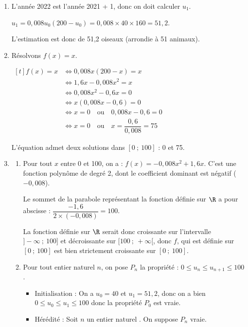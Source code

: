 \medskip

\begin{enumerate}
\item L'année 2022 est l'année 2021 + 1, donc on doit calculer $u_1$.

$u_1 = 0,008u_0(200 - u_0) = 0,008\times 40 \times 160 = 51,2$.

L'estimation est donc de 51,2 oiseaux (arrondie à 51 animaux).

\item Résolvons $f(x) = x$.

$ \begin{aligned}[t] f(x) = x &\iff 0,008x(200 - x) = x \\
&\iff 1,6x - 0,008x^2 = x\\
&\iff 0,008x^2 - 0,6x = 0\\
&\iff x(0,008x - 0,6) = 0\\
&\iff x = 0 \quad \text{ou}\quad 0,008x - 0,6 = 0\\
&\iff x = 0 \quad \text{ou}\quad x = \dfrac{0,6}{0,008} =75
\end{aligned}$

L'équation admet deux solutions dans $ [0~;~100] $ : 0 et 75.

\item 
	\begin{enumerate}
		\item Pour tout $x$ entre 0 et 100, on a : $f(x) = -0,008x^2 + 1,6x$. C'est une fonction polynôme de degré 2, dont le coefficient dominant est négatif ($-0,008$).

Le sommet de la parabole représentant la fonction définie sur $\R$ a pour abscisse : $\dfrac{- 1,6}{2\times (- 0,008)} = 100$.

La fonction définie sur $\R$ serait donc croissante sur l'intervalle $]-\infty~;~100]$ et décroissante sur $[100~;~+\infty[$, donc $f$, qui est définie sur $[0~;~100]$ est bien strictement croissante sur $ [0~;~100] $.

		\item Pour tout entier naturel $n$, on pose $P_n$ la propriété : \og $0\leqslant u_n \leqslant u_{n+1} \leqslant 100$\fg{}.

\begin{itemize}
\item Initialisation : On a $u_0 = 40$ et $u_1 = 51,2$, donc on a bien $0 \leqslant u_0 \leqslant u_1 \leqslant 100$ donc la propriété $P_0$ est vraie.
\item Hérédité : Soit $n$ un entier naturel . On suppose $P_n$ vraie.


\end{itemize}
\end{enumerate}
\end{enumerate}
